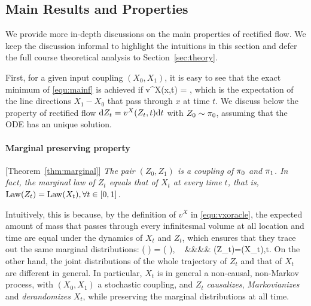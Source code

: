  


 
 





 
 
 \subsection{Main Results and Properties} 
 \label{sec:secondintro}

We provide more in-depth discussions 
on the main properties of  rectified flow. 
We keep the discussion informal 
to highlight the intuitions  in this section and defer the 
  full course theoretical analysis to  Section~\ref{sec:theory}. %
 
 First, 
 for a given input coupling $(X_0,X_1)$, 
it is easy to see that the exact minimum of \eqref{equ:mainf} is achieved if 
 \bbb \label{equ:vxoracle}
 v^X(x,t) = \E[X_1- X_0 ~|~ X_t=x],
 \eee 
 which is the expectation of the line directions $X_1-X_0$ that pass through $x$ at time $t$. 
 We discuss below the property of rectified flow $\mathrm{d} Z_t = v^X(Z_t,t)\mathrm{d}t $ with $Z_0\sim {\pi}_0$,
 assuming that the ODE has an unique solution. %
 
 \paragraph{Marginal preserving property} [Theorem~\ref{thm:marginal}] \emph{The pair $(Z_0,Z_1)$ is a coupling of ${\pi}_0$ and ${\pi}_1$. 
In fact, the marginal law of $Z_t$ equals that of $X_t$ at every time  $t$, that is, $\mathrm{Law}(Z_t)=\mathrm{Law}(X_t), \forall t\in[0,1]$. } 

Intuitively, this is because, by the definition of $v^X$ in \eqref{equ:vxoracle}, the expected amount of mass
that  passes through every infinitesmal volume at all location and time are equal under the dynamics of $X_t$ and $Z_t$, which ensures that they trace out the same marginal distributions: \newcommand{\imineq}[2]{\vcenter{\hbox{\texttt{[image: \#1]}}}}
\bb 
{}\!\left(\imineq{arxiv_figures/arrow11_new.png}{6} \right) \!\! = 
\!\left(\imineq{arxiv_figures/arrow22_new.png}{6} \right)\!, ~\forall {} 
&&\implies && \law(Z_t)=\law(X_t),\forall t.%
\ee 
On the other hand, the joint distributions of the whole trajectory of $Z_t$ and that of $X_t$ are  different in general.  
In particular, $X_t$ is in general a non-causal, non-Markov process, 
with $(X_0,X_1)$ a stochastic coupling,
and $Z_t$  \emph{causalizes}, \emph{Markovianizes}
 and \emph{derandomizes} $X_t$, while preserving the marginal distributions at all time.  



